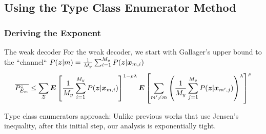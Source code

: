 \documentclass[mathserif]{beamer}
\newcommand {\bx} {\mbox{\boldmath $x$}}
\newcommand {\bz} {\mbox{\boldmath $z$}}
\newcommand {\bE} {\mbox{\boldmath $E$}}
\newcommand{\lb}{\left(}
\newcommand{\rb}{\right)}
\begin{document}
\subsection{Using the Type Class Enumerator Method}
\begin{frame}
\frametitle{Deriving the Exponent}
\begin{block}{The weak decoder}
For the weak decoder, we start with Gallager's upper bound to the ``channel`` $P(\bz|m)=\frac{1}{M_y}\sum_{i=1}^{M_y}P(\bz|\bx_{m,i})$
\small\begin{align*}
    \overline{P_{E_m}^z}\le
    \sum_{\bz}\bE\left[\frac{1}{M_y}\sum_{i=1}^{M_y}P(\bz|\bx_{m,i})\right]^{1-\rho\lambda}
    \bE\left[\sum_{m'\ne m}\left(\frac{1}{M_y}\sum_{j=1}^{M_y}P(\bz|\bx_{m',j})\right)^\lambda
    \right]^\rho
\end{align*}
\end{block}
\normalsize
\begin{exampleblock}{Type class enumerators approach:}
    Unlike previous works that use Jensen's inequality, after this initial step, our analysis is exponentially tight.
\end{exampleblock}
\end{frame}

\end{document}
